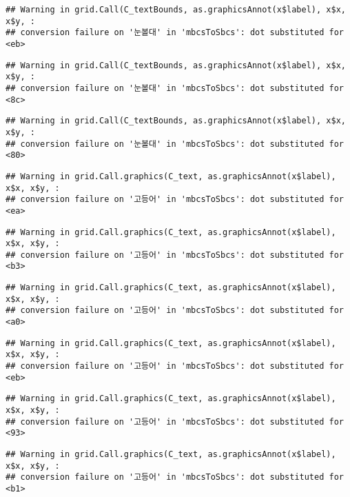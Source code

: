\documentclass[
]{article}
\begin{document}
\begin{verbatim}
## Warning in grid.Call(C_textBounds, as.graphicsAnnot(x$label), x$x, x$y, :
## conversion failure on '눈볼대' in 'mbcsToSbcs': dot substituted for <eb>
\end{verbatim}

\begin{verbatim}
## Warning in grid.Call(C_textBounds, as.graphicsAnnot(x$label), x$x, x$y, :
## conversion failure on '눈볼대' in 'mbcsToSbcs': dot substituted for <8c>
\end{verbatim}

\begin{verbatim}
## Warning in grid.Call(C_textBounds, as.graphicsAnnot(x$label), x$x, x$y, :
## conversion failure on '눈볼대' in 'mbcsToSbcs': dot substituted for <80>
\end{verbatim}

\begin{verbatim}
## Warning in grid.Call.graphics(C_text, as.graphicsAnnot(x$label), x$x, x$y, :
## conversion failure on '고등어' in 'mbcsToSbcs': dot substituted for <ea>
\end{verbatim}

\begin{verbatim}
## Warning in grid.Call.graphics(C_text, as.graphicsAnnot(x$label), x$x, x$y, :
## conversion failure on '고등어' in 'mbcsToSbcs': dot substituted for <b3>
\end{verbatim}

\begin{verbatim}
## Warning in grid.Call.graphics(C_text, as.graphicsAnnot(x$label), x$x, x$y, :
## conversion failure on '고등어' in 'mbcsToSbcs': dot substituted for <a0>
\end{verbatim}

\begin{verbatim}
## Warning in grid.Call.graphics(C_text, as.graphicsAnnot(x$label), x$x, x$y, :
## conversion failure on '고등어' in 'mbcsToSbcs': dot substituted for <eb>
\end{verbatim}

\begin{verbatim}
## Warning in grid.Call.graphics(C_text, as.graphicsAnnot(x$label), x$x, x$y, :
## conversion failure on '고등어' in 'mbcsToSbcs': dot substituted for <93>
\end{verbatim}

\begin{verbatim}
## Warning in grid.Call.graphics(C_text, as.graphicsAnnot(x$label), x$x, x$y, :
## conversion failure on '고등어' in 'mbcsToSbcs': dot substituted for <b1>
\end{verbatim}
\end{document}
